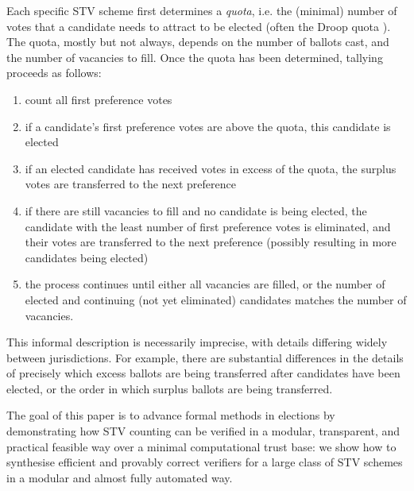 \documentclass[10pt,conference]{IEEEtran}
\begin{document}

Each specific STV scheme first determines a \emph{quota}, i.e. the (minimal) number of votes that a candidate needs to attract to be elected (often the Droop quota \cite{Droop:1881:MER}). The quota, mostly but not always, depends on the number of ballots cast, and the number of vacancies to fill. Once the quota has been determined, tallying proceeds as follows:
\begin{enumerate}
  \item count all first preference votes
  \item if a candidate's first preference votes are above the quota, this candidate is elected
  \item if an elected candidate has received votes in excess of the quota, the surplus votes are transferred to the next preference 
  \item if there are still vacancies to fill and no candidate is  being elected, the candidate with the least number of first preference votes is eliminated, and their votes are transferred to the next preference (possibly resulting in more candidates being elected)
  \item the process continues until either all vacancies are filled, or the number of elected and continuing (not yet eliminated) candidates matches the number of vacancies.
\end{enumerate}

This informal description is necessarily imprecise, with details
differing widely between jurisdictions. For example, there are
substantial differences in the details of
precisely which excess ballots are being transferred after
candidates have been elected, or  the order in which surplus ballots are
being transferred.

The goal of this paper is to advance formal methods in elections by
demonstrating how STV counting can be verified in a modular,
transparent, and practical feasible way over a minimal computational
trust base:  we show how to synthesise efficient and provably
correct verifiers for a large class of STV schemes in a modular and
almost fully automated way.
\end{document}
